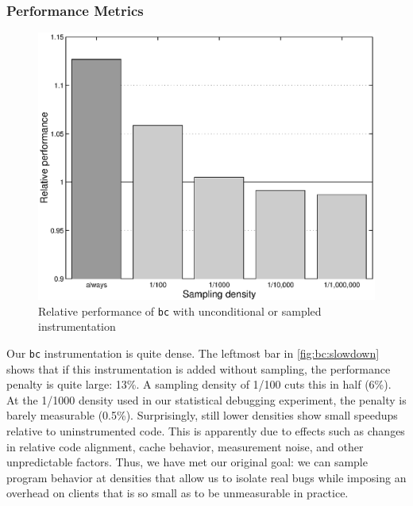 \subsubsection{Performance Metrics}

\begin{figure}
  \centering
  \small
  \includegraphics[width=\columnwidth]{applications/bc_density}
  \caption{Relative performance of \texttt{bc} with unconditional or
    sampled instrumentation}
  \label{fig:bc:slowdown}
\end{figure}

Our \texttt{bc} instrumentation is quite dense.  The leftmost bar in
\autoref{fig:bc:slowdown} shows that if this instrumentation is added
without sampling, the performance penalty is quite large: 13\%.  A
sampling density of 1/100 cuts this in half (6\%).  At the 1/1000
density used in our statistical debugging experiment, the penalty is
barely measurable (0.5\%).  Surprisingly, still lower densities show
small speedups relative to uninstrumented code.  This is apparently
due to effects such as changes in relative code alignment, cache
behavior, measurement noise, and other unpredictable factors.  Thus,
we have met our original goal: we can sample program behavior at
densities that allow us to isolate real bugs while imposing an
overhead on clients that is so small as to be unmeasurable in
practice.


